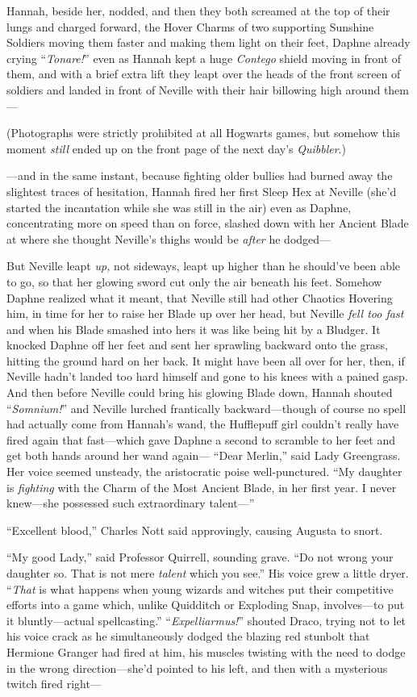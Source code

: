 Hannah, beside her, nodded, and then they both screamed at the
top of their lungs and charged forward, the Hover Charms of two
supporting Sunshine Soldiers moving them faster and making them
light on their feet, Daphne already crying “\emph{Tonare!}” even as
Hannah kept a huge \emph{Contego} shield moving in front of them,
and with a brief extra lift they leapt over the heads of the front
screen of soldiers and landed in front of Neville with their hair
billowing high around them—

(Photographs were strictly prohibited at all Hogwarts games, but
somehow this moment \emph{still} ended up on the front page of the
next day’s \emph{Quibbler}.)

—and in the same instant, because fighting older bullies had
burned away the slightest traces of hesitation, Hannah fired her
first Sleep Hex at Neville (she’d started the incantation while she
was still in the air) even as Daphne, concentrating more on speed
than on force, slashed down with her Ancient Blade at where she
thought Neville’s thighs would be \emph{after} he dodged—

But Neville leapt \emph{up,} not sideways, leapt up higher than
he should’ve been able to go, so that her glowing sword cut only
the air beneath his feet. Somehow Daphne realized what it meant,
that Neville still had other Chaotics Hovering him, in time for her
to raise her Blade up over her head, but Neville \emph{fell too
fast} and when his Blade smashed into hers it was like being hit
by a Bludger. It knocked Daphne off her feet and sent her sprawling
backward onto the grass, hitting the ground hard on her back. It
might have been all over for her, then, if Neville hadn’t landed
too hard himself and gone to his knees with a pained gasp. And then
before Neville could bring his glowing Blade down, Hannah shouted
“\emph{Somnium!}” and Neville lurched frantically backward—though
of course no spell had actually come from Hannah’s wand, the
Hufflepuff girl couldn’t really have fired again that fast—which
gave Daphne a second to scramble to her feet and get both hands
around her wand again—
\sbreak
“Dear Merlin,” said Lady Greengrass. Her voice seemed unsteady,
the aristocratic poise well-punctured. “My daughter is
\emph{fighting} with the Charm of the Most Ancient Blade, in her
first year. I never knew—she possessed such extraordinary talent—”

“Excellent blood,” Charles Nott said approvingly, causing
Augusta to snort.

“My good Lady,” said Professor Quirrell, sounding grave. “Do not
wrong your daughter so. That is not mere \emph{talent} which you
see.” His voice grew a little dryer. “\emph{That} is what happens
when young wizards and witches put their competitive efforts into a
game which, unlike Quidditch or Exploding Snap, involves—to put
it bluntly—actual spellcasting.”
\sbreak
“\emph{Expelliarmus!}” shouted Draco, trying not to let his
voice crack as he simultaneously dodged the blazing red stunbolt
that Hermione Granger had fired at him, his muscles twisting with
the need to dodge in the wrong direction—she’d pointed to his
left, and then with a mysterious twitch fired right—

